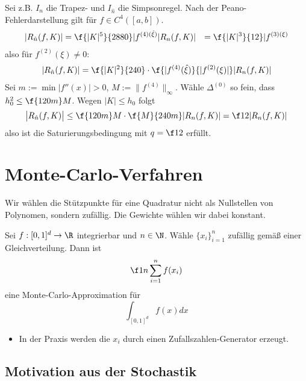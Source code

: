 \documentclass[11pt]{scrbook}
\begin{document}
\begin{st}
\begin{note}
\begin{itemize}
				Sei z.B. $I_n$ die Trapez- und $I_{\hat n}$  die Simpsonregel.
				Nach der Peano-Fehlerdarstellung gilt für $f\in C^4([a,b])$.
				\begin{align*}
					|R_{\hat n}(f, K)| &= \f {|K|^5}{2880} |f^{(4)(\hat \xi)}
					|R_{n}(f, K)| &= \f {|K|^3}{12} |f^{(3)(\xi)}
				\end{align*}
				also für $f^{(2)}(\xi) \neq 0$:
				\begin{align*}
					|R_{\hat n}(f,K)| = \f {|K|^2}{240} \cdot \f {|f^{(4)}(\hat \xi)}{|f^{(2)}(\xi)|} |R_n(f,K)|
				\end{align*}
				Sei $m := \min |f''(x)| > 0$, $M := \|f^{(4)}\|_\infty$.
				Wähle $\Delta^{(0)}$ so fein, dass $h_0^2 \le \f {120 m}M$.
				Wegen $|K| \le h_0$ folgt
				\[
					\big| R_{\hat n}(f, K) \big| 
					\le \f {120m}M \cdot \f{M}{240m} |R_n(f,K)|
					= \f 12 |R_n(f,K)|
				\]
				also ist die Saturierungsbedingung mit $q=\f 12$ erfüllt.
		\end{itemize}
	\end{note}
\end{st}

\section{Monte-Carlo-Verfahren}

Wir wählen die Stützpunkte für eine Quadratur nicht als Nullstellen von Polynomen, sondern zufällig.
Die Gewichte wählen wir dabei konstant.

\begin{df}
	\label{2.38}	
	Sei $f:[0,1]^d \to \R$ integrierbar und $n\in \N$.
	Wähle $\{x_i\}_{i=1}^n$ zufällig gemäß einer Gleichverteilung.
	Dann ist
	\[
		\f 1n \sum_{i=1}^n f(x_i)
	\]
	eine Monte-Carlo-Approximation für
	\[
		\int_{[0,1]^d} f(x) dx
	\]
\end{df}

\begin{nt*}
	\begin{itemize}
		\item
			In der Praxis werden die $x_i$ durch einen Zufallszahlen-Generator erzeugt.
	\end{itemize}
\end{nt*}

\subsection{Motivation aus der Stochastik}
\end{document}
